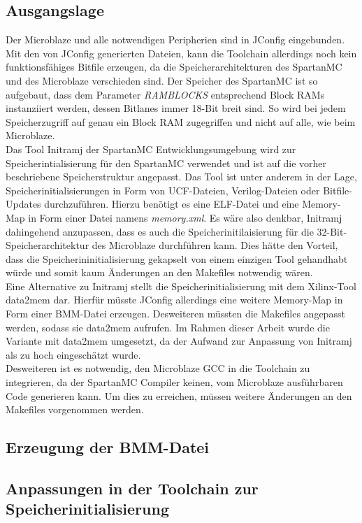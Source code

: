 \subsection{Ausgangslage}
Der Microblaze und alle notwendigen Peripherien sind in JConfig eingebunden. Mit den von JConfig generierten Dateien, kann die Toolchain allerdings noch kein funktionsfähiges Bitfile erzeugen, da die Speicherarchitekturen des SpartanMC und des Microblaze verschieden sind. Der Speicher des SpartanMC ist so aufgebaut, dass dem Parameter \textit{RAMBLOCKS} entsprechend Block RAMs instanziiert werden, dessen Bitlanes immer 18-Bit breit sind. So wird bei jedem Speicherzugriff auf genau ein Block RAM zugegriffen und nicht auf alle, wie beim Microblaze.\\
Das Tool Initramj der SpartanMC Entwicklungsumgebung wird zur Speicherintialisierung für den SpartanMC verwendet und ist auf die vorher beschriebene Speicherstruktur angepasst. Das Tool ist unter anderem in der Lage, Speicherinitialisierungen in Form von UCF-Dateien, Verilog-Dateien oder Bitfile-Updates durchzuführen. Hierzu benötigt es eine ELF-Datei und eine Memory-Map in Form einer Datei namens \textit{memory.xml}. Es wäre also denkbar, Initramj dahingehend anzupassen, dass es auch die Speicherinitilaisierung für die 32-Bit-Speicherarchitektur des Microblaze durchführen kann. Dies hätte den Vorteil, dass die Speicherininitialisierung gekapselt von einem einzigen Tool gehandhabt würde und somit kaum Änderungen an den Makefiles notwendig wären.\\
Eine Alternative zu Initramj stellt die Speicherinitialisierung mit dem Xilinx-Tool data2mem dar. Hierfür müsste JConfig allerdings eine weitere Memory-Map in Form einer BMM-Datei erzeugen. Desweiteren müssten die Makefiles angepasst werden, sodass sie data2mem aufrufen. Im Rahmen dieser Arbeit wurde die Variante mit data2mem umgesetzt, da der Aufwand zur Anpassung von Initramj als zu hoch eingeschätzt wurde.\\
Desweiteren ist es notwendig, den Microblaze GCC in die Toolchain zu integrieren, da der SpartanMC Compiler keinen, vom Microblaze ausführbaren Code generieren kann. Um dies zu erreichen, müssen weitere Änderungen an den Makefiles vorgenommen werden.
\subsection{Erzeugung der BMM-Datei}

\subsection{Anpassungen in der Toolchain zur Speicherinitialisierung}

